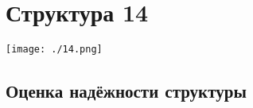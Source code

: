\documentclass[12pt, a4paper] {ncc}
\begin{document}



\section{Структура 14}

	\texttt{[image: ./14.png]}


    \subsection{Оценка надёжности структуры}
\end{document}
